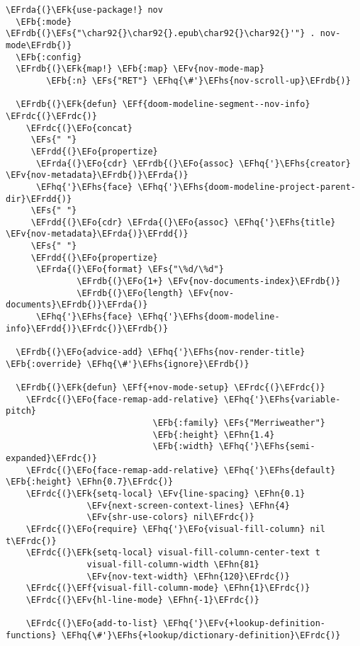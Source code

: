 \documentclass[a4wide,10pt]{article}
\newcommand{\EFs}[1]{\textcolor{EFs}{#1}} %
\newcommand{\EFk}[1]{\textcolor{EFk}{#1}} %
\newcommand{\EFb}[1]{\textcolor{EFb}{#1}} %
\newcommand{\EFf}[1]{\textcolor{EFf}{#1}} %
\newcommand{\EFv}[1]{\textcolor{EFv}{#1}} %
\newcommand{\EFo}[1]{\textcolor{EFo}{#1}} %
\newcommand{\EFhn}[1]{\textcolor{EFhn}{\textbf{#1}}} %
\newcommand{\EFhq}[1]{\textcolor{EFhq}{#1}} %
\newcommand{\EFhs}[1]{\textcolor{EFhs}{#1}} %
\newcommand{\EFrda}[1]{\textcolor{EFrda}{#1}} %
\newcommand{\EFrdb}[1]{\textcolor{EFrdb}{#1}} %
\newcommand{\EFrdc}[1]{\textcolor{EFrdc}{#1}} %
\newcommand{\EFrdd}[1]{\textcolor{EFrdd}{#1}} %
\begin{document}
\begin{Code}
\begin{Verbatim}
\EFrda{(}\EFk{use-package!} nov
  \EFb{:mode} \EFrdb{(}\EFs{"\char92{}\char92{}.epub\char92{}\char92{}'"} . nov-mode\EFrdb{)}
  \EFb{:config}
  \EFrdb{(}\EFk{map!} \EFb{:map} \EFv{nov-mode-map}
        \EFb{:n} \EFs{"RET"} \EFhq{\#'}\EFhs{nov-scroll-up}\EFrdb{)}

  \EFrdb{(}\EFk{defun} \EFf{doom-modeline-segment--nov-info} \EFrdc{(}\EFrdc{)}
    \EFrdc{(}\EFo{concat}
     \EFs{" "}
     \EFrdd{(}\EFo{propertize}
      \EFrda{(}\EFo{cdr} \EFrdb{(}\EFo{assoc} \EFhq{'}\EFhs{creator} \EFv{nov-metadata}\EFrdb{)}\EFrda{)}
      \EFhq{'}\EFhs{face} \EFhq{'}\EFhs{doom-modeline-project-parent-dir}\EFrdd{)}
     \EFs{" "}
     \EFrdd{(}\EFo{cdr} \EFrda{(}\EFo{assoc} \EFhq{'}\EFhs{title} \EFv{nov-metadata}\EFrda{)}\EFrdd{)}
     \EFs{" "}
     \EFrdd{(}\EFo{propertize}
      \EFrda{(}\EFo{format} \EFs{"\%d/\%d"}
              \EFrdb{(}\EFo{1+} \EFv{nov-documents-index}\EFrdb{)}
              \EFrdb{(}\EFo{length} \EFv{nov-documents}\EFrdb{)}\EFrda{)}
      \EFhq{'}\EFhs{face} \EFhq{'}\EFhs{doom-modeline-info}\EFrdd{)}\EFrdc{)}\EFrdb{)}

  \EFrdb{(}\EFo{advice-add} \EFhq{'}\EFhs{nov-render-title} \EFb{:override} \EFhq{\#'}\EFhs{ignore}\EFrdb{)}

  \EFrdb{(}\EFk{defun} \EFf{+nov-mode-setup} \EFrdc{(}\EFrdc{)}
    \EFrdc{(}\EFo{face-remap-add-relative} \EFhq{'}\EFhs{variable-pitch}
                             \EFb{:family} \EFs{"Merriweather"}
                             \EFb{:height} \EFhn{1.4}
                             \EFb{:width} \EFhq{'}\EFhs{semi-expanded}\EFrdc{)}
    \EFrdc{(}\EFo{face-remap-add-relative} \EFhq{'}\EFhs{default} \EFb{:height} \EFhn{0.7}\EFrdc{)}
    \EFrdc{(}\EFk{setq-local} \EFv{line-spacing} \EFhn{0.1}
                \EFv{next-screen-context-lines} \EFhn{4}
                \EFv{shr-use-colors} nil\EFrdc{)}
    \EFrdc{(}\EFo{require} \EFhq{'}\EFo{visual-fill-column} nil t\EFrdc{)}
    \EFrdc{(}\EFk{setq-local} visual-fill-column-center-text t
                visual-fill-column-width \EFhn{81}
                \EFv{nov-text-width} \EFhn{120}\EFrdc{)}
    \EFrdc{(}\EFf{visual-fill-column-mode} \EFhn{1}\EFrdc{)}
    \EFrdc{(}\EFv{hl-line-mode} \EFhn{-1}\EFrdc{)}

    \EFrdc{(}\EFo{add-to-list} \EFhq{'}\EFv{+lookup-definition-functions} \EFhq{\#'}\EFhs{+lookup/dictionary-definition}\EFrdc{)}


\end{Verbatim}
\end{Code}
\end{document}
